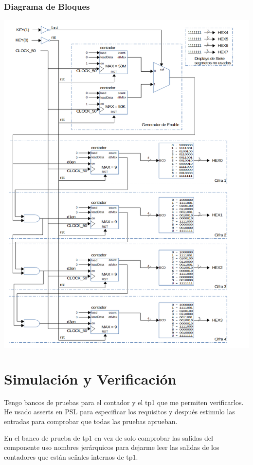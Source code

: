 \documentclass[a4paper]{article}
\begin{document}
\begin{minipage}{\textwidth}
\subsubsection{Diagrama de Bloques}

\includegraphics[width=14cm]{img/tp1_bloque.png}

\end{minipage}

\section{Simulación y Verificación}
Tengo bancos de pruebas para el contador y el tp1 que me permiten verificarlos. He usado asserts en PSL para especificar los requisitos y después estimulo las entradas para comprobar que todas las pruebas aprueban.

En el banco de prueba de tp1 en vez de solo comprobar las salidas del componente uso nombres jerárquicos para dejarme leer las salidas de los contadores que están señales internos de tp1.
\end{document}

